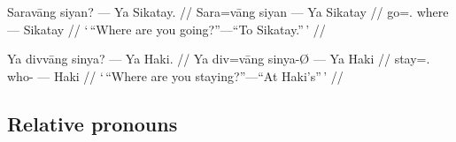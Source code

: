 \pex
\a\begingl
	\gla Saravāng siyan? --- Ya Sikatay. //
	\glb Sara=vāng siyan --- Ya Sikatay //
	\glc go=\Ssg{}.\Aarg{} where --- \Loc{} Sikatay //
	\glft `\,\enquote{Where are you going?}---\enquote{To Sikatay.}\,' //
\endgl

\a\begingl
	\gla Ya divvāng sinya? --- Ya Haki. //
	\glb Ya div=vāng sinya-Ø --- Ya Haki //
	\glc \LocT{} stay=\Ssg{}.\Aarg{} who-\Top{} --- \Loc{} Haki //
	\glft `\,\enquote{Where are you staying?}---\enquote{At Haki's}\,' //
\endgl

\xe


\subsection{Relative pronouns}

